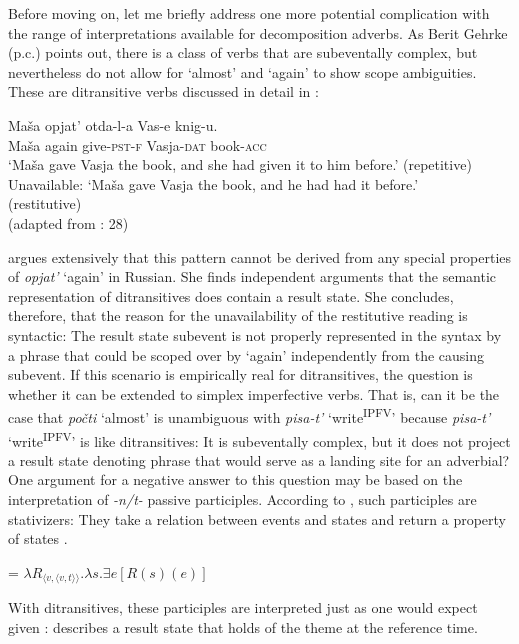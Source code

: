 \documentclass[output=paper,colorlinks,citecolor=brown]{langscibook}
\begin{document}
Before moving on, let me briefly address one more potential complication with the range of interpretations available for decomposition adverbs. As Berit Gehrke (p.c.) points out, there is a class of verbs that are subeventally complex, but nevertheless do not allow for ‘almost’ and ‘again’ to show scope ambiguities. These are ditransitive verbs  discussed in detail in \citet{Bondarenko2018}:

\ea
\gll Maša  opjat’  otda-l-a  Vas-e  knig-u.\\
Maša  again  give-\textsc{pst-f}  Vasja-\textsc{dat}  book-\textsc{acc}\\
\glt `Maša gave Vasja the book, and she had given it to him before.’ \hfill (repetitive) \\
Unavailable: `Maša gave Vasja the book, and he had had it before.’\\\xspace\hfill (restitutive) \\
 \hfill (adapted from \citealt{Bondarenko2018}: 28)
\z 

\noindent \citeauthor{Bondarenko2018} argues extensively that this pattern cannot be derived from any special properties of \textit{opjat’} ‘again’ in Russian. She finds independent arguments that the semantic representation of ditransitives does contain a result state. She concludes, therefore, that the reason for the unavailability of the restitutive reading is syntactic: The result state subevent is not properly represented in the syntax by a phrase that could be scoped over by ‘again’ independently from the causing subevent. If this scenario is empirically real for ditransitives, the question is whether it can be extended to simplex imperfective verbs. That is, can it be the case that \textit{počti} ‘almost’ is unambiguous with \textit{pisa-t’}  ‘write\textsuperscript{IPFV}’ because \textit{pisa-t’} ‘write\textsuperscript{IPFV}’ is like ditransitives: It is subeventally complex, but it does not project a result state denoting phrase that would serve as a landing site for an adverbial? One argument for a negative answer to this question may be based on the interpretation of \textit{-n/t-} passive participles. According to \citet{Paslawska.Stechow2003}, such participles are stativizers: They take a relation between events and states and return a property of states .

\ea\label{ex:tatevosov:ii}
 = $\lambda R_{\langle v, \langle v,t\rangle \rangle}. \lambda s. \exists e [R(s)(e)]$
\z

\noindent With ditransitives, these participles are interpreted just as one would expect given :  describes a result state that holds of the theme at the reference time.
\end{document}
